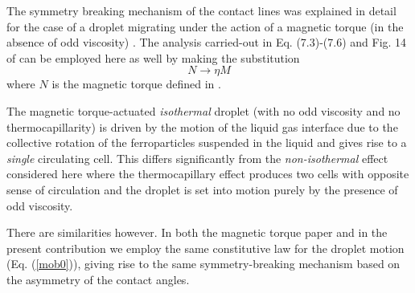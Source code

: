 \documentclass[%
 amsmath,amssymb,
 aps,
10.5pt]{revtex4-2}
\def\rr#1{(\ref{#1})}
\newcommand{\be}{\begin{equation}}
\newcommand{\ee}{\end{equation}}
\begin{document}
{The symmetry breaking mechanism of the contact lines was explained in detail for the case of 
a droplet migrating under the action 
of a magnetic torque (in the absence of odd viscosity) \cite{Aggarwal2023}. The analysis carried-out
in Eq. (7.3)-(7.6) and Fig. 14 of \cite{Aggarwal2023} can be employed here as well by making
the substitution
\be
N \rightarrow \eta M
\ee
where $N$ is the magnetic torque defined in \cite{Aggarwal2023}.

The magnetic torque-actuated \emph{isothermal} droplet (with no odd viscosity and no thermocapillarity) \cite{Aggarwal2023}
is driven by the motion of the liquid gas interface due to the collective rotation of the ferroparticles
suspended in the liquid and gives rise to a \emph{single} circulating cell. This differs
significantly from the \emph{non-isothermal} effect considered here where the thermocapillary effect
produces two cells with opposite sense of circulation and the droplet is set into motion purely by
the presence of odd viscosity. 

There are similarities however. In both the magnetic torque paper \cite{Aggarwal2023}
and in the present contribution we employ the same constitutive law for the droplet 
motion (Eq. \rr{mob0}), giving rise to the same symmetry-breaking mechanism based 
on the asymmetry of the contact angles. 
}








%
%
%
%
\end{document}
